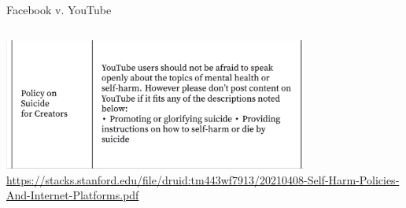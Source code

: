 \documentclass[nobackground,dvipsnames,table,aspectratio=169]{beamer}
\begin{document}
\begin{frame}{Facebook v. YouTube}
\begin{columns}
            \centering
            \includegraphics[width=0.75\textwidth]{policy-on-suicide-youtube}
            \tiny
            \url{https://stacks.stanford.edu/file/druid:tm443wf7913/20210408-Self-Harm-Policies-And-Internet-Platforms.pdf}
    \end{columns}
\end{frame}
\end{document}
